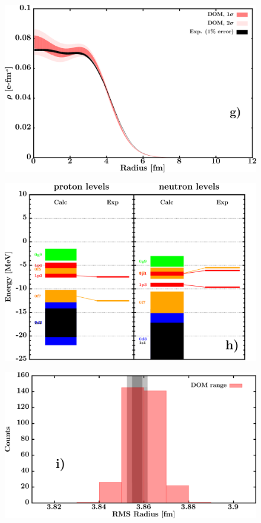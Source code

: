 \documentclass[twocolumn,secnumarabic,amssymb, nobibnotes, aps, prl,
superscriptaddress, nobalancelastpage, draft]{revtex4}
\begin{document}
\begin{figure}[!htb]
\begin{minipage}{0.4\linewidth}
        \includegraphics[width=\linewidth]{figures/ni64_chargeDensity.png}
        \label{DOM_ni64_chargeDensity}
    \end{minipage}\hspace{6pt}
    \begin{minipage}{0.4\linewidth}
        \centering
        \includegraphics[width=\linewidth]{figures/ni64_SPLevels.png}
        \label{DOM_ni64_SPLevels}
    \end{minipage}
    \begin{minipage}{0.4\linewidth}
        \centering
        \includegraphics[width=\linewidth]{figures/ni64_RMSRadius.png}

\end{minipage}
\end{figure}
\end{document}
